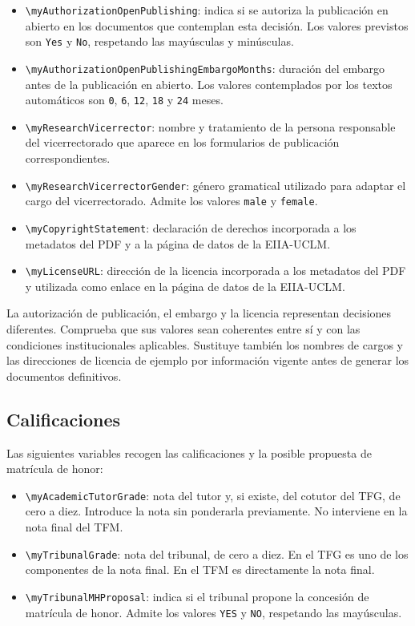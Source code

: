 \begin{itemize}
  \item \texttt{\textbackslash{}myAuthorizationOpenPublishing}: indica si se autoriza la publicación en abierto en los documentos que contemplan esta decisión. Los valores previstos son \texttt{Yes} y \texttt{No}, respetando las mayúsculas y minúsculas.
  \item \texttt{\textbackslash{}myAuthorizationOpenPublishingEmbargoMonths}: duración del embargo antes de la publicación en abierto. Los valores contemplados por los textos automáticos son \texttt{0}, \texttt{6}, \texttt{12}, \texttt{18} y \texttt{24} meses.
  \item \texttt{\textbackslash{}myResearchVicerrector}: nombre y tratamiento de la persona responsable del vicerrectorado que aparece en los formularios de publicación correspondientes.
  \item \texttt{\textbackslash{}myResearchVicerrectorGender}: género gramatical utilizado para adaptar el cargo del vicerrectorado. Admite los valores \texttt{male} y \texttt{female}.
  \item \texttt{\textbackslash{}myCopyrightStatement}: declaración de derechos incorporada a los metadatos del PDF y a la página de datos de la EIIA-UCLM.
  \item \texttt{\textbackslash{}myLicenseURL}: dirección de la licencia incorporada a los metadatos del PDF y utilizada como enlace en la página de datos de la EIIA-UCLM.
\end{itemize}

La autorización de publicación, el embargo y la licencia representan decisiones diferentes. Comprueba que sus valores sean coherentes entre sí y con las condiciones institucionales aplicables. Sustituye también los nombres de cargos y las direcciones de licencia de ejemplo por información vigente antes de generar los documentos definitivos.

\subsection{Calificaciones}

Las siguientes variables recogen las calificaciones y la posible propuesta de matrícula de honor:

\begin{itemize}
  \item \texttt{\textbackslash{}myAcademicTutorGrade}: nota del tutor y, si existe, del cotutor del TFG, de cero a diez. Introduce la nota sin ponderarla previamente. No interviene en la nota final del TFM.
  \item \texttt{\textbackslash{}myTribunalGrade}: nota del tribunal, de cero a diez. En el TFG es uno de los componentes de la nota final. En el TFM es directamente la nota final.
  \item \texttt{\textbackslash{}myTribunalMHProposal}: indica si el tribunal propone la concesión de matrícula de honor. Admite los valores \texttt{YES} y \texttt{NO}, respetando las mayúsculas.
\end{itemize}


